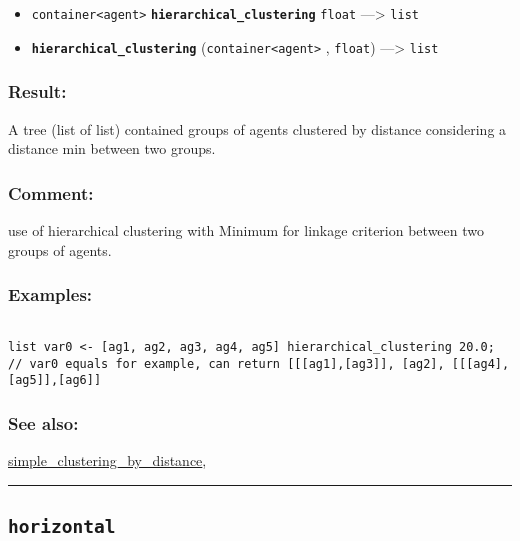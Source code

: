 \documentclass[]{book}
\providecommand{\tightlist}{%
  \setlength{\itemsep}{0pt}\setlength{\parskip}{0pt}}
\theoremstyle{definition}
\theoremstyle{definition}
\theoremstyle{definition}
\theoremstyle{remark}
\begin{document}
\begin{itemize}
\tightlist
\item
  \texttt{container\textless{}agent\textgreater{}}
  \textbf{\texttt{hierarchical\_clustering}} \texttt{float}
  ---\textgreater{} \texttt{list}
\item
  \textbf{\texttt{hierarchical\_clustering}}
  (\texttt{container\textless{}agent\textgreater{}} , \texttt{float})
  ---\textgreater{} \texttt{list}
\end{itemize}

\subsubsection{Result:}\label{result-250}

A tree (list of list) contained groups of agents clustered by distance
considering a distance min between two groups.

\subsubsection{Comment:}\label{comment-49}

use of hierarchical clustering with Minimum for linkage criterion
between two groups of agents.

\subsubsection{Examples:}\label{examples-199}

\begin{verbatim}
 
list var0 <- [ag1, ag2, ag3, ag4, ag5] hierarchical_clustering 20.0; // var0 equals for example, can return [[[ag1],[ag3]], [ag2], [[[ag4],[ag5]],[ag6]]
\end{verbatim}

\subsubsection{See also:}\label{see-also-112}

\href{OperatorsSZ\#simple_clustering_by_distance}{simple\_clustering\_by\_distance},

\begin{center}\rule{0.5\linewidth}{\linethickness}\end{center}

\subsection{\texorpdfstring{\texttt{horizontal}}{horizontal}}\label{horizontal}
\end{document}

